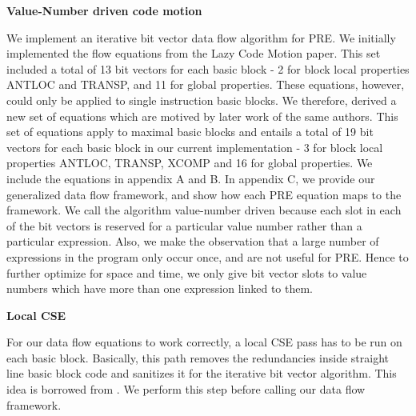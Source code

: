 \begin{flushleft}
\textbf{\Large{Value-Number driven code motion}}
\end{flushleft}
We implement an iterative bit vector data flow algorithm for PRE. We initially
implemented the flow equations from the Lazy Code Motion paper. This set
included a total of 13 bit vectors for each basic block - 2 for block local
properties ANTLOC and TRANSP, and 11 for global properties. These equations,
           however, could only be applied to single instruction basic blocks.
           We therefore, derived a new set of equations which are motived by
           later work\cite{Knoop:1994:OCM:183432.183443} of the same authors.
           This set of equations apply to maximal basic blocks and
           entails a total of 19 bit vectors for each basic block in our
           current implementation - 3 for block local properties ANTLOC,
           TRANSP, XCOMP and 16 for global properties.  We include the
           equations in appendix A and B. In appendix C, we provide our generalized
           data flow framework, and show how each PRE equation maps to the
           framework. We call the algorithm value-number driven because each
           slot in each of the bit vectors is reserved for a particular value
           number rather than a particular expression. Also, we make the
           observation that a large number of expressions in the program only
           occur once, and are not useful for PRE. Hence to further optimize
           for space and time, we only give bit vector slots to value numbers
           which have more than one expression linked to them.

\begin{flushleft}
\textbf{\large{Local CSE}}
\end{flushleft}
For our data flow equations to work correctly, a local CSE pass has to be run
on each basic block. Basically, this path removes the redundancies inside
straight line basic block code and sanitizes it for the iterative bit vector
algorithm. This idea is borrowed from \cite{Knoop:1994:OCM:183432.183443}. We perform this step before calling
our data flow framework. 

